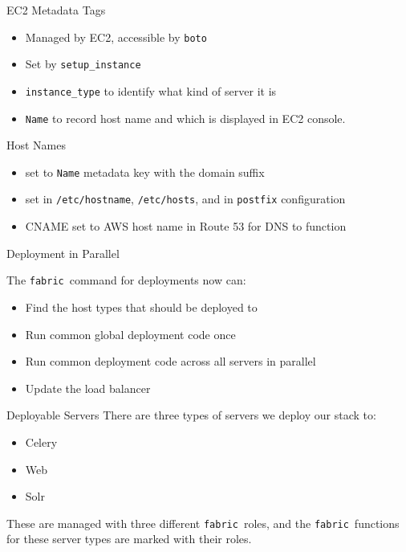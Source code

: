 \documentclass{beamer}
\begin{document}
\begin{frame}{EC2 Metadata Tags}

  \begin{itemize}
    \item Managed by EC2, accessible by \texttt{boto}
    \item Set by \texttt{setup\_instance}
    \item \texttt{instance\_type} to identify what kind of server it
      is
    \item \texttt{Name} to record host name and which is displayed
      in EC2 console.
    \end{itemize}
\end{frame}

\begin{frame}{Host Names}
  
  \begin{itemize}
  \item set to \texttt{Name} metadata key with the domain suffix
  \item set in \texttt{/etc/hostname}, \texttt{/etc/hosts}, and in
    \texttt{postfix} configuration
  \item CNAME set to AWS host name in Route 53 for DNS to function
  \end{itemize}

\end{frame}

\begin{frame}{Deployment in Parallel}

The \texttt{fabric}\ command for deployments now can:

\begin{itemize}
\item Find the host types that should be deployed to
\item Run common global deployment code once
\item Run common deployment code across all servers in parallel
\item Update the load balancer
\end{itemize}

\end{frame}

\begin{frame}{Deployable Servers}
There are three types of servers we deploy our stack to:

\begin{itemize}
\item Celery
\item Web
\item Solr
\end{itemize}

These are managed with three different \texttt{fabric}\ roles, and
the \texttt{fabric}\ functions for these server types are marked with
their roles.

\end{frame}
\end{document}

